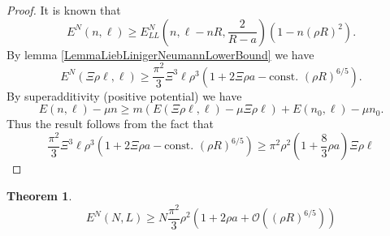 \documentclass[a4paper,11pt]{article}
\newtheorem{theorem}{Theorem}
\numberwithin{equation}{section}
\begin{document}
	\begin{proof}
		It is known that \begin{equation}
		E^{N}(n,\ell)\geq E_{LL}^N\left(n,\ell-nR,\frac{2}{R-a}\right)\left(1-n(\rho R)^2\right).
		\end{equation}
		By lemma \ref{LemmaLiebLinigerNeumannLowerBound} we have \begin{equation}
		E^{N}(\Xi\rho\ell,\ell)\geq\frac{\pi^2}{3}\Xi^3\ell\rho^3\left(1+2\Xi\rho a-\text{const. }(\rho R)^{6/5}\right).
		\end{equation}
		By superadditivity (positive potential) we have \begin{equation}
		E(n,\ell)-\mu n\geq m\left(E(\Xi\rho\ell,\ell)-\mu\Xi\rho\ell \right)+E(n_0,\ell)-\mu n_0.
		\end{equation}
		Thus the result follows from the fact that \begin{equation}
		\frac{\pi^2}{3}\Xi^3\ell\rho^3\left(1+2\Xi\rho a-\text{const. }(\rho R)^{6/5}\right)\geq \pi^2\rho^2\left(1+\frac{8}{3}\rho a\right) \Xi\rho\ell
		\end{equation}
	\end{proof}
	\begin{theorem}
		\begin{equation}
		E^N(N,L)\geq N\frac{\pi^2}{3}\rho^2\left(1+2\rho a+\mathcal{O}\left((\rho R)^{6/5}\right)\right)
		\end{equation}
	\end{theorem}
\end{document}
